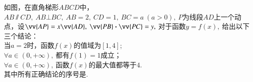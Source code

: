 \documentclass{BHCexam}
\newcommand{\xl}[2]{\vv{#1}\bm\cdot\vv{#2}}
\begin{document}
\begin{questions}
\qs 如图，在直角梯形$ ABCD $中，$ AB\sslash CD,~AB\bot BC,~AB=2,~CD=1,~BC=a~(a>0),~ P$为线段$ AD $上一个动点，设$ \vv{AP}=x\vv{AD},~ \xl{PB}{PC}=y,~$对于函数$y=f(x),~$给出以下三个结论：\\
 当$ a=2 $时，函数$f(x)$的值域为$ \left[1,4\right] $;\\
 $ \forall a\in\left(0,+\infty\right),~$都有$ f(1)=1 $成立；\\
 $ \forall a\in\left(0,+\infty\right),~$函数$f(x)$的最大值都等于$ 4 $.\\
其中所有正确结论的序号是\tk.
\vspace{-7em}
\begin{flushright}
\end{flushright}

\end{questions}
\end{document}
